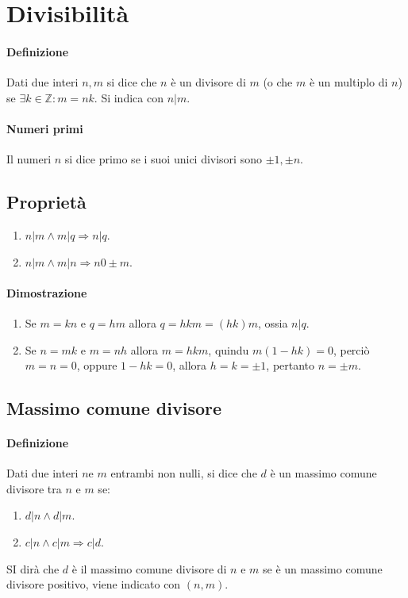 \chapter{Divisibilit\`a}
\subsubsection{Definizione}
Dati due interi $n,m$ si dice che $n$ \`e un divisore di $m$ (o che $m$ \`e un multiplo di $n$) se $\exists k\in\mathbb{Z}:m=nk$. Si indica con $n|m$.
\subsubsection{Numeri primi}
Il numeri $n$ si dice primo se i suoi unici divisori sono $\pm 1, \pm n$.
\section{Propriet\`a}
\begin{enumerate}
\item $n|m\wedge m|q\Rightarrow n|q$.
\item $n|m\wedge m|n\Rightarrow n0\pm m$.
\end{enumerate}
\subsubsection{Dimostrazione}
\begin{enumerate}
\item Se $m=kn$ e $q=hm$ allora $q=hkm=(hk)m$, ossia $n|q$.
\item Se $n=mk$ e $m=nh$ allora $m=hkm$, quindu $m(1-hk)=0$, perci\`o $m=n=0$, oppure $1-hk=0$, allora $h=k=\pm 1$, pertanto $n=\pm m$.
\end{enumerate}
\section{Massimo comune divisore}
\subsubsection{Definizione}
Dati due interi $n$e $m$ entrambi non nulli, si dice che $d$ \`e un massimo comune divisore tra $n$ e $m$ se:
\begin{enumerate}
\item $d|n\wedge d|m$.
\item $c|n\wedge c|m\Rightarrow c|d$.
\end{enumerate}
SI dir\`a che $d$ \`e il massimo comune divisore di $n$ e $m$ se \`e un massimo comune divisore positivo, viene indicato con $(n,m)$.
